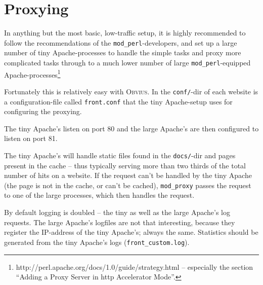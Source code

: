 \documentclass[a4paper,12pt]{article}
\newcommand{\obvius}{\textsc{Obvius}}
\newcommand{\modperl}{\texttt{mod\_perl}}
\newcommand{\modproxy}{\texttt{mod\_proxy}}
\begin{document}
\pagebreak
\appendix
\section{Proxying}

In anything but the most basic, low-traffic setup, it is highly
recommended to follow the recommendations of the \modperl-developers,
and set up a large number of tiny Apache-processes to handle the
simple tasks and proxy more complicated tasks through to a much lower
number of large \modperl-equipped
Apache-processes\footnote{http://perl.apache.org/docs/1.0/guide/strategy.html
  -- especially the section ``Adding a Proxy Server in http Accelerator Mode''.}

Fortunately this is relatively easy with \obvius. In the
\texttt{conf/}-dir of each website is a configuration-file called
\texttt{front.conf} that the tiny Apache-setup uses for configuring
the proxying.

The tiny Apache's listen on port 80 and the large Apache's are then
configured to listen on port 81.

The tiny Apache's will handle static files found in the
\texttt{docs/}-dir and pages present in the cache -- thus typically
serving more than two thirds of the total number of hits on a website.
If the request can't be handled by the tiny Apache (the page is not in
the cache, or can't be cached), {\modproxy} passes the request to one
of the large processes, which then handles the request.

By default logging is doubled -- the tiny as well as the large
Apache's log requests. The large Apache's logfiles are not that
interesting, because they register the IP-address of the tiny
Apache's; always the same. Statistics should be generated from the
tiny Apache's logs (\texttt{front\_custom.log}).
\end{document}
